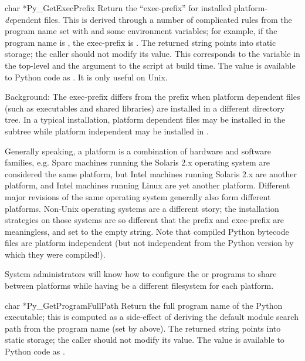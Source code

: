 \documentclass[twoside]{report}
\begin{document}
\begin{cfuncdesc}{char *}{Py_GetExecPrefix}{}
Return the ``exec-prefix'' for installed platform-\emph{de}pendent 
files.  This is derived through a number of complicated rules from the 
program name set with  and some environment 
variables; for example, if the program name is 
, the exec-prefix is 
.  The returned string points into static storage; 
the caller should not modify its value.  This corresponds to the 
 variable in the top-level  and the 
 argument to the  script at build 
time.  The value is available to Python code as 
.  It is only useful on Unix.

Background: The exec-prefix differs from the prefix when platform 
dependent files (such as executables and shared libraries) are 
installed in a different directory tree.  In a typical installation, 
platform dependent files may be installed in the 
 subtree while platform independent may be 
installed in .

Generally speaking, a platform is a combination of hardware and 
software families, e.g.  Sparc machines running the Solaris 2.x 
operating system are considered the same platform, but Intel machines 
running Solaris 2.x are another platform, and Intel machines running 
Linux are yet another platform.  Different major revisions of the same 
operating system generally also form different platforms.  Non-Unix 
operating systems are a different story; the installation strategies 
on those systems are so different that the prefix and exec-prefix are 
meaningless, and set to the empty string.  Note that compiled Python 
bytecode files are platform independent (but not independent from the 
Python version by which they were compiled!).

System administrators will know how to configure the  or 
 programs to share  between platforms 
while having  be a different filesystem for each 
platform.
\end{cfuncdesc}

\begin{cfuncdesc}{char *}{Py_GetProgramFullPath}{}
Return the full program name of the Python executable; this is 
computed as a side-effect of deriving the default module search path 
from the program name (set by  above).  The 
returned string points into static storage; the caller should not 
modify its value.  The value is available to Python code as 
.
\end{cfuncdesc}
\end{document}
